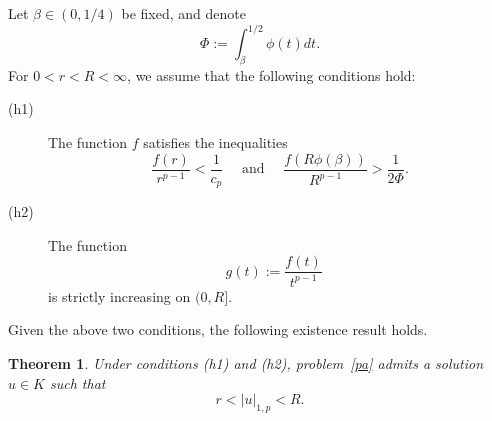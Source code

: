 \documentclass{birkjour}
\newtheorem{theorem}{Theorem}[section]
\theoremstyle{definition}
\theoremstyle{remark}
\numberwithin{equation}{section}
\begin{document}
%
%

Let $\beta \in (0,1/4)$ be fixed, and denote
\begin{equation*}
\Phi :=\int_{\beta }^{1/2}\phi (t)dt.
\end{equation*}%
For $0<r<R<\infty $, we assume that the following conditions hold:

\begin{description}
\item[(h1)] The function $f$ satisfies the inequalities
\begin{equation}  \label{conditie r}
\frac{f(r)}{r^{p-1}}<\frac{1}{c_{p}}\quad \text{ and }\quad \frac{f(R\phi
(\beta ))}{ R^{p-1}}>\frac{1}{2\Phi }.
\end{equation}

\item[(h2)] The function
\begin{equation*}
g\left( t\right) :=\frac{f(t)}{t^{p-1}}\,\text{ }
\end{equation*}%
is strictly increasing on $(0,R].$
\end{description}

Given the above two conditions, the following existence result holds.

\begin{theorem}
\label{pa1} Under conditions (h1) and (h2), problem~\eqref{pa} admits a
solution $u\in K$ such that
\begin{equation*}
r<|u|_{1,p}<R.
\end{equation*}
\end{theorem}
\end{document}
